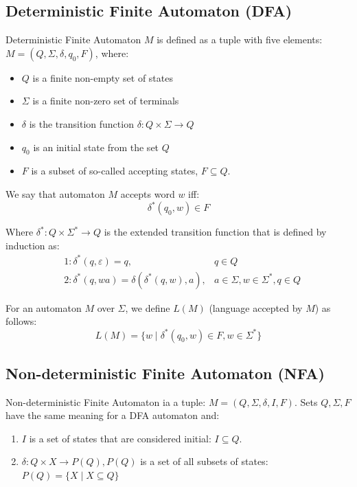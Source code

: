 \documentclass{ctuthesis}
\begin{document}
\subsection{Deterministic Finite Automaton (DFA)}
Deterministic Finite Automaton $M$ is defined as a tuple with five elements: $M = (Q, \Sigma, \delta, q_0, F)$, where:
\begin{itemize}
	\item $Q$ is a finite non-empty set of states
	\item $\Sigma$ is a finite non-zero set of terminals
	\item $\delta$ is the transition function $\delta : Q \times \Sigma \rightarrow Q$
	\item $q_0$ is an initial state from the set $Q$
	\item $F$ is a subset of so-called accepting states, $F \subseteq Q$.
\end{itemize}

We say that automaton $M$ accepts word $w$ iff:
\begin{equation*}
	\delta^*(q_0, w) \in F
\end{equation*}

Where $\delta^* : Q \times \Sigma^* \rightarrow Q$ is the extended transition function that is defined by induction as:
\begin{align*}
	&1: \delta^*(q, \varepsilon) = q, &q \in Q \\
	&2: \delta^*(q, wa) = \delta(\delta^*(q, w), a), &a \in \Sigma, w \in \Sigma^*, q \in Q
\end{align*}

For an automaton $M$ over $\Sigma$, we define $L(M)$ (language accepted by $M$) as follows:
\begin{equation*}
	L(M) = \{w \mid \delta^*(q_0, w) \in F, w \in \Sigma^*\}
\end{equation*}

\subsection{Non-deterministic Finite Automaton (NFA)}
Non-deterministic Finite Automaton ia a tuple: $M = (Q, \Sigma, \delta, I, F)$. Sets $Q, \Sigma, F$ have the same meaning for a DFA automaton and: 
\begin{enumerate}
	\item $I$ is a set of states that are considered initial: $I \subseteq Q$.
	\item $\delta : Q \times X \rightarrow P(Q), P(Q)$ is a set of all subsets of states: $P(Q) = \{X \mid X \subseteq Q\}$
\end{enumerate}
\end{document}
